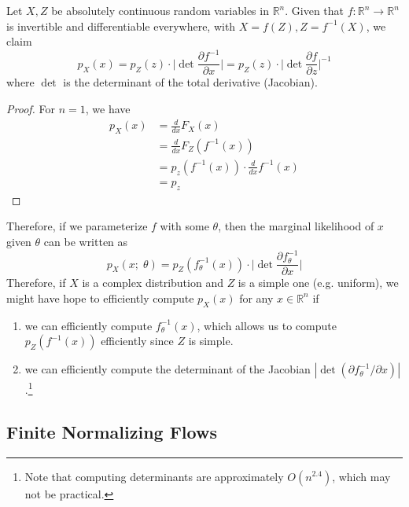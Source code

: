   \begin{lemma}[Jacobi] 
    Let $X, Z$ be absolutely continuous random variables in $\mathbb{R}^n$. 
    Given that $f: \mathbb{R}^n \rightarrow \mathbb{R}^n$ is invertible and differentiable everywhere, with $X = f(Z), Z = f^{-1} (X)$, we claim 
    \begin{equation}
      p_X (x) = p_Z (z) \cdot \bigg| \det \frac{\partial f^{-1}}{\partial x} \bigg| = p_Z (z) \cdot \bigg| \det \frac{\partial f}{\partial z}  \bigg|^{-1}
    \end{equation} 
    where $\det$ is the determinant of the total derivative (Jacobian). 
  \end{lemma}
  \begin{proof}
    For $n = 1$, we have 
    \begin{align}
      p_X (x) & = \frac{d}{dx} F_X (x) \\
              & = \frac{d}{dx} F_Z (f^{-1}(x)) \\
              & = p_z (f^{-1} (x)) \cdot \frac{d}{dx} f^{-1} (x)  \\
              & = p_z 
    \end{align}
  \end{proof} 

  Therefore, if we parameterize $f$ with some $\theta$, then the marginal likelihood of $x$ given $\theta$ can be written as 
  \begin{equation}
    p_X (x;\; \theta) = p_Z (f^{-1}_\theta (x)) \cdot \bigg| \det \frac{\partial f_\theta^{-1}}{\partial x} \bigg|
  \end{equation} 
  Therefore, if $X$ is a complex distribution and $Z$ is a simple one (e.g. uniform), we might have hope to efficiently compute $p_X (x)$ for any $x \in \mathbb{R}^n$ if 
  \begin{enumerate}
    \item we can efficiently compute $f^{-1}_\theta (x)$, which allows us to compute $p_Z (f^{-1} (x))$ efficiently since $Z$ is simple. 
    \item we can efficiently compute the determinant of the Jacobian $|\det (\partial f_\theta^{-1}/\partial x)|$.\footnote{Note that computing determinants are approximately $O(n^{2.4})$, which may not be practical. } 
  \end{enumerate}  

\subsection{Finite Normalizing Flows}

